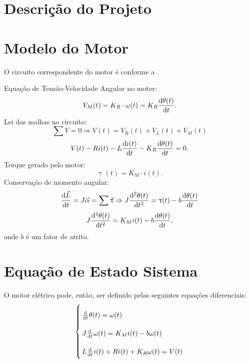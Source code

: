 \documentclass[12pt,brazilian]{article}
\date{\today}
\newcommand*{\dt}[1]{
    \dv{#1}{t}
    }
\newcommand*{\ddt}[1]{
    \dv[2]{#1}{t}
    }
\begin{document}
\setTema
\geraTituloProjeto
\sumario


\section{Descrição do Projeto}

\lipsum[3]

\section{Modelo do Motor}

\noindent
O circuito correspondente do motor é conforme a .


Equação de Tensão-Velocidade Angular no motor:
\begin{equation}
    V_M(t) = K_R\cdot\omega(t)=K_R \dt{\theta(t)}  .
\end{equation}
Lei das malhas no circuito:
\begin{equation*}
    \sum V = 0 \Rightarrow V(t) = V_R(t) + V_L(t) + V_M(t)
\end{equation*}
\begin{equation}\label{eq:EquacaoDiferencialTensao}
    V(t) - R i(t) - L\dt{i(t)} - K_R\dt{\theta(t)} = 0 .
\end{equation}
Torque gerado pelo motor:
\begin{equation}
    \uptau(t) = K_M\cdot i(t) .
\end{equation}
Conservação de momento angular:
\begin{equation*}
    \dt{\vec{L}} = J\vec{\alpha}= \sum \vec{\uptau} \Rightarrow J\ddt{\theta(t)} = \uptau(t) -b \dt{\theta(t)}
\end{equation*}
\begin{equation}\label{eq:EquacaoDiferencialTorque}
    J\ddt{\theta(t)} = K_M i(t) -b \dt{\theta(t)},
\end{equation}
onde $b$ é um fator de atrito.


\section{Equação de Estado Sistema}

O motor elétrico pode, então, ser definido pelas seguintes equações diferenciais:
\begin{equation}
\arraycolsep=1.4pt\def\arraystretch{2.2}
\left\{\begin{array}{l}
{ \dv{t}\theta(t)=\omega(t)} \\ 
{J \dv{t}\omega(t)= K_M i(t)} - b \omega(t) \\ 
{L \dv{t}i(t)+R i(t)+K_R\omega(t)=V(t)} 
\end{array}\right.
\end{equation}
\end{document}
